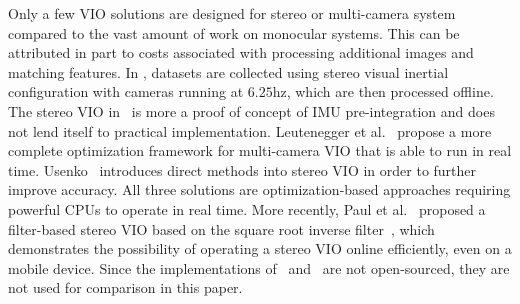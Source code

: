 Only a few VIO solutions are designed for stereo or multi-camera system~\cite{lupton2012visual, leutenegger2015keyframe, usenko2016direct, paulcomparative} compared to the vast amount of work on monocular systems. This can be attributed in part to costs associated with processing additional images and matching features.
In \cite{lupton2012visual}, datasets are collected using stereo visual inertial configuration with cameras running at $6.25$hz, which are then processed offline. The stereo VIO in~\cite{lupton2012visual} is more a proof of concept of IMU pre-integration and does not lend itself to practical implementation. Leutenegger et al.~\cite{leutenegger2015keyframe} propose a more complete optimization framework for multi-camera VIO that is able to run in real time. Usenko~\cite{usenko2016direct} introduces direct methods into stereo VIO in order to further improve accuracy. All three solutions are optimization-based approaches requiring powerful CPUs to operate in real time. More recently, Paul et al.~\cite{paulcomparative} proposed a filter-based stereo VIO based on the square root inverse filter~\cite{wu2015square}, which demonstrates the possibility of operating a stereo VIO online efficiently, even on a mobile device. Since the implementations of~\cite{usenko2016direct} and~\cite{wu2015square} are not open-sourced, they are not used for comparison in this paper.

